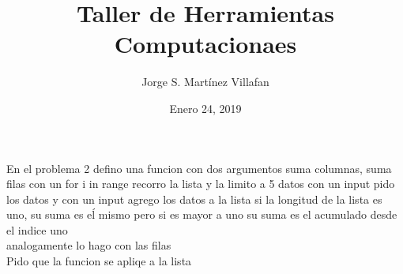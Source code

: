 \documentclass[letterpaper, 12pt, oneside]{article}%
\title{\Huge Taller de Herramientas Computacionaes}
\author{Jorge S. Martínez Villafan}
\date{Enero 24, 2019}
\begin{document}
En el problema 2 defino una funcion con dos argumentos suma columnas, suma filas con un for i in range recorro la lista y la limito a 5 datos con un input pido los datos y con un input agrego los datos a la lista si la longitud de la lista es uno, su suma es eĺ mismo
pero si es mayor a uno su suma es el acumulado desde el indice uno \\analogamente lo hago con las filas
\\Pido que la funcion se apliqe a la lista 
\end{document}
